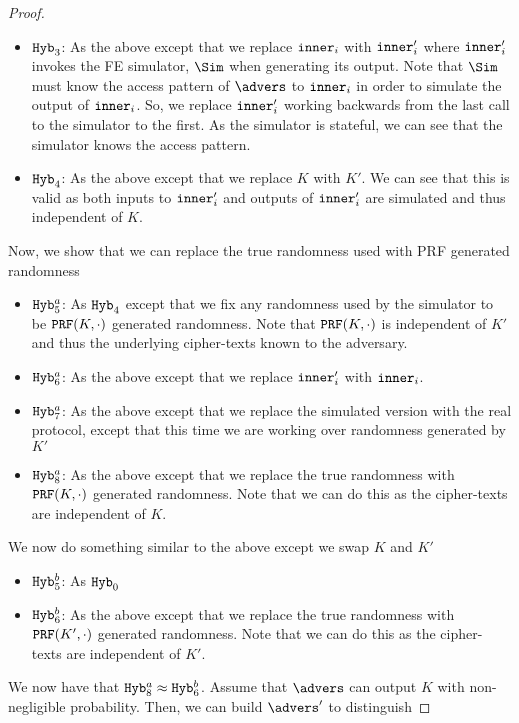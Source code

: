 \begin{lemma}
\begin{proof}
\begin{itemize}
			\item $\texttt{Hyb}_3$: As the above except that we replace $\texttt{inner}_i$ with $\texttt{inner}_i'$ where $\texttt{inner}_i'$ invokes the FE simulator, $\Sim$ when generating its output.
			Note that $\Sim$ must know the access pattern of $\advers$ to $\texttt{inner}_i$ in order to simulate the output of $\texttt{inner}_i$.
			So, we replace $\texttt{inner}_i'$ working backwards from the last call to the simulator to the first.
			As the simulator is stateful, we can see that the simulator knows the access pattern.
			\item $\texttt{Hyb}_4$: As the above except that we replace $K$ with $K'$.
			We can see that this is valid as both inputs to $\texttt{inner}'_i$ and outputs of $\texttt{inner}'_i$ are simulated and thus independent of $K$.
		\end{itemize}
	Now, we show that we can replace the true randomness used with PRF generated randomness
	\begin{itemize}
		\item $\texttt{Hyb}_5^a$: As $\texttt{Hyb}_4$ except that we fix any randomness used by the simulator to be $\texttt{PRF}(K, \cdot)$ generated randomness.
		Note that $\texttt{PRF}(K, \cdot)$ is independent of $K'$ and thus the underlying cipher-texts known to the adversary.
		\item $\texttt{Hyb}_6^a$: As the above except that we replace $\texttt{inner}'_i$ with $\texttt{inner}_i$.
		\item $\texttt{Hyb}_7^a$: As the above except that we replace the simulated version with the real protocol, except that this time we are working over randomness generated by $K'$
		\item $\texttt{Hyb}_8^a$: As the above except that we replace the true randomness with $\texttt{PRF}(K, \cdot)$ generated randomness.
		Note that we can do this as the cipher-texts are independent of $K$.
	\end{itemize}
	We now do something similar to the above except we swap $K$ and $K'$
	\begin{itemize}
		\item $\texttt{Hyb}_5^b$: As $\texttt{Hyb}_0$
		\item $\texttt{Hyb}_6^b$: As the above except that we replace the true randomness with $\texttt{PRF}(K', \cdot)$ generated randomness.
		Note that we can do this as the cipher-texts are independent of $K'$.
	\end{itemize}
	We now have that $\texttt{Hyb}_8^a \approx \texttt{Hyb}_6^b$.
	Assume that $\advers$ can output $K$ with non-negligible probability. Then, we can build $\advers'$ to distinguish

\end{proof}
\end{lemma}
